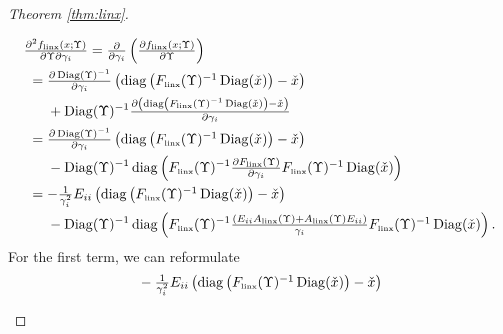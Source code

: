 \documentclass[smallextended]{svjour3hack}       %
\DeclareMathOperator{\Diag}{Diag}
\DeclareMathOperator{\diag}{diag}
\begin{document}
\begin{proof}[Theorem \ref{thm:linx}]
\begin{itemize}
\begin{align*}
    &\textstyle\frac{\partial^2 f_{{\tiny\mbox{linx}}}\left(x;\Upsilon\right)}{\partial \Upsilon \partial \gamma_i}=\textstyle\frac{\partial}{\partial\gamma_i}\left(\frac{\partial f_{{\tiny\mbox{linx}}}\left(x;\Upsilon\right)}{\partial \Upsilon}\right)\\
    & ~= \textstyle\frac{\partial \Diag(\Upsilon)^{-1}}{\partial\gamma_i} \left(\diag\left(F_{{\tiny\mbox{linx}}}(\Upsilon)^{-1}\Diag(\check{x})\right)-\check{x}\right)\\
    &~~\quad +\Diag(\Upsilon)^{-1}  \textstyle\frac{\partial \left(\diag\left(F_{{\tiny\mbox{linx}}}(\Upsilon)^{-1}\Diag(\check{x})\right)-\check{x} \right)}{\partial\gamma_i} \\
    & ~ =\textstyle\frac{\partial \Diag(\Upsilon)^{-1}}{\partial\gamma_i}\left(\diag\left(F_{{\tiny\mbox{linx}}}(\Upsilon)^{-1}\Diag(\check{x})\right)-\check{x}\right)\\
    &~~\quad -\Diag(\Upsilon)^{-1}  \diag\left(F_{{\tiny\mbox{linx}}}(\Upsilon)^{-1} \textstyle\frac{\partial F_{{\tiny\mbox{linx}}}(\Upsilon)}{\partial\gamma_i}F_{{\tiny\mbox{linx}}}(\Upsilon)^{-1}\Diag(\check{x})\right) \\
    &~= -\textstyle\frac{1}{\gamma_i^2}E_{ii}\left(\diag\left(F_{{\tiny\mbox{linx}}}(\Upsilon)^{-1}\Diag(\check{x})\right)-\check{x}\right)\\
    &~~\quad -\Diag(\Upsilon)^{-1}\diag\left(F_{{\tiny\mbox{linx}}}(\Upsilon)^{-1}\textstyle\frac{\left(E_{ii}A_{{\tiny\mbox{linx}}}(\Upsilon)+A_{{\tiny\mbox{linx}}}(\Upsilon) E_{ii}\right)}{\gamma_i}
    F_{{\tiny\mbox{linx}}}(\Upsilon)^{-1}\Diag(\check{x})\right).
\end{align*}
 For the first term, we can reformulate
 \begin{align*}
    & -\textstyle\frac{1}{\gamma_i^2}E_{ii}\left(\diag\left(F_{{\tiny\mbox{linx}}}(\Upsilon)^{-1}\Diag(\check{x})\right)-\check{x}\right)\\

\end{align*}
\end{itemize}
\end{proof}
\end{document}
